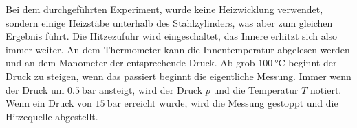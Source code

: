 Bei dem durchgeführten Experiment, wurde keine Heizwicklung verwendet, sondern einige Heizstäbe unterhalb des Stahlzylinders, was aber zum gleichen Ergebnis führt.
Die Hitzezufuhr wird eingeschaltet, das Innere erhitzt sich also immer weiter.
An dem Thermometer kann die Innentemperatur abgelesen werden und an dem Manometer der entsprechende Druck.
Ab grob $\SI{100}{\celsius}$ beginnt der Druck zu steigen, wenn das passiert beginnt die eigentliche Messung.
Immer wenn der Druck um $\SI{0.5}{\bar}$ ansteigt, wird der Druck $p$ und die Temperatur $T$ notiert.
Wenn ein Druck von $\SI{15}{\bar}$ erreicht wurde, wird die Messung gestoppt und die Hitzequelle abgestellt.